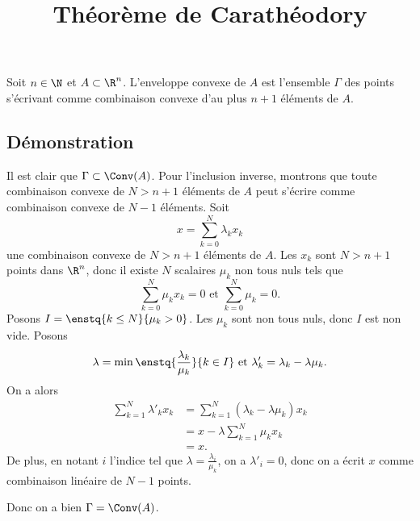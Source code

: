 \documentclass[fontsize=12pt,twoside=false,parskip=half, french]{scrartcl}
\title{Théorème de Carathéodory}
\date{}
\author{}
\begin{document}
\maketitle
   \begin{Theoreme}
      Soit $n \in \N$ et $A \subset \R^n$. L'enveloppe convexe de $A$ est 
      l'ensemble $\Gamma$ des points s'écrivant comme combinaison convexe
      d'au plus $n + 1$ éléments de $A$.
   \end{Theoreme}
   \subsection{Démonstration}
      Il est clair que $\Gamma \subset \Conv(A)$. Pour l'inclusion inverse, 
      montrons que toute combinaison convexe de $N > n + 1$ éléments de $A$ peut
      s'écrire comme combinaison convexe de $N - 1$ éléments. Soit 
      \[
        x = \sum_{k = 0}^N \lambda_kx_k
      \] 
      une combinaison convexe de $N > n + 1$ éléments de $A$. Les $x_k$
      sont $N > n + 1$ points dans $\R^n$, donc il existe $N$ scalaires $\mu_k$
      non tous nuls tels que
      \[
         \sum_{k = 0}^N \mu_kx_k = 0 \text{ et }  \sum_{k = 0}^N \mu_k = 0.
      \]
      Posons $I = \enstq{k \leq N}{\mu_k > 0}$. Les $\mu_k$ sont non tous nuls,
      donc $I$ est non vide. Posons
      \[
        \lambda = \min \enstq{\frac{\lambda_k}{\mu_k}}{k \in I} \text { et }
        \lambda'_k = \lambda_k - \lambda\mu_k.
      \]
      On a alors
      \begin{align*}
        \sum_{k = 1}^N \lambda'_k x_k 
          &= \sum_{k = 1}^N (\lambda_k - \lambda\mu_k) x_k\\
          &= x - \lambda \sum_{k = 1}^N \mu_k x_k\\
          &= x.
      \end{align*}
      De plus, en notant $i$ l'indice tel que $\lambda = \frac{\lambda_i}{\mu_k}$,
      on a $\lambda'_i = 0$, donc on a écrit $x$ comme combinaison linéaire de
      $N - 1$ points.
      
      Donc on a bien $\Gamma = \Conv(A)$.
\end{document}
